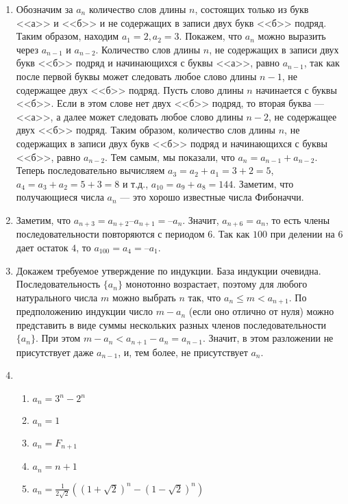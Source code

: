 \documentclass[14pt,openany]{book}
\begin{document}
\begin{enumerate}
\begin{enumerate}
 \end{enumerate}

\item Обозначим за $a_n$ количество слов длины $n$, состоящих только из букв <<а>> и <<б>> и не содержащих в записи двух букв <<б>> подряд. Таким образом, находим $a_1=2, a_2=3$. Покажем, что $a_n$ можно выразить через $a_{n-1}$ и $a_{n-2}$. Количество слов длины $n$, не содержащих в записи двух букв <<б>> подряд и начинающихся с буквы <<а>>, равно $a_{n-1}$, так как после первой буквы может следовать любое слово длины $n-1$, не содержащее двух <<б>> подряд. Пусть слово длины $n$ начинается с буквы <<б>>. Если в этом слове нет двух <<б>> подряд, то вторая буква --- <<а>>, а далее может следовать любое слово длины $n-2$, не содержащее двух <<б>> подряд. Таким образом, количество слов длины $n$, не содержащих в записи двух букв <<б>> подряд и начинающихся с буквы <<б>>, равно $a_{n-2}$. Тем самым, мы показали, что $a_n=a_{n-1}+a_{n-2}$. Теперь последовательно вычисляем $a_3=a_2+a_1=3+2=5$, $a_4=a_3+a_2=5+3=8$ и т.д., $a_{10}=a_9+a_8=144$. Заметим, что получающиеся числа $a_n$ --- это хорошо известные числа Фибоначчи. 

\item Заметим, что  $a_{n+3} = a_{n+2} – a_{n+1} = –a_n$.  Значит,  $a_{n+6} = a_n$,  то есть члены последовательности повторяются с периодом $6$. Так как $100$ при делении на $6$ дает остаток $4$, то  $a_{100} = a_4 = –a_1$.

\item Докажем требуемое утверждение по индукции. База индукции очевидна. Последовательность $\{a_n\}$ монотонно возрастает, поэтому для любого натурального числа $m$ можно выбрать $n$ так, что 
$a_n \le m < a_{n+1}$. По предположению индукции число $m - a_n$ (если оно отлично от нуля) можно представить в виде суммы нескольких разных членов последовательности $\{a_n\}$. При этом 
$m - a_n < a_{n + 1} - a_n = a_{n - 1}$. Значит, в этом разложении не присутствует даже 
$a_{n - 1}$, и, тем более, не присутствует $a_n$. 

\item 
  \begin{enumerate}
    \item $a_n = 3^n - 2^n$
    \item $a_n = 1$
    \item $a_n = F_{n+1}$
    \item $a_n = n + 1$
    \item $a_n = \frac{1}{2\sqrt{2}}\left(\left(1+\sqrt{2}\right)^n - \left(1-\sqrt{2}\right)^n\right)$
  \end{enumerate}


\end{enumerate}
\end{document}
